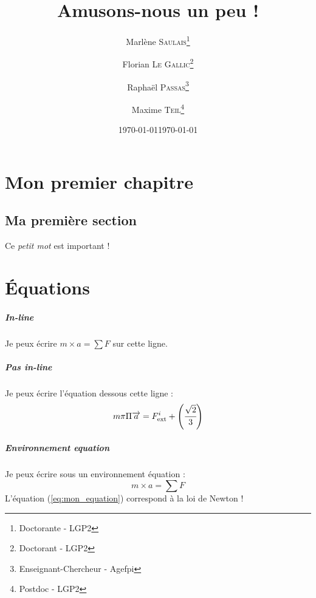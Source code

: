 \documentclass[a4paper, 13pt]{report} %
\date{\today}
\title{Amusons-nous un peu !}
\author{Marlène \textsc{Saulais}\thanks{Doctorante - LGP2}
		\and Florian \textsc{Le Gallic}\thanks{Doctorant - LGP2}
		\and Rapha\"el \textsc{Passas}\thanks{Enseignant-Chercheur - Agefpi}
		\and Maxime \textsc{Teil}\thanks{Postdoc - LGP2}}
\date{\today}
\begin{document}
	
	\maketitle
	
	\chapter{Mon premier chapitre}
	\blindtext
	\section{Ma première section}
	\blindtext[3]
	Ce \emph{petit mot} est important !\\
	\chapter{\'Equations}
	\paragraph{In-line}
	Je peux écrire $m \times a = \sum F$ sur cette ligne.
	\paragraph{Pas in-line}
	Je peux écrire l'équation dessous cette ligne :
	$$ m \pi \Pi \overrightarrow{a} = F^i_{\text{ext}} + \left(\cfrac{
		\sqrt{2}
		}{
		3
		}\right)  $$
	\paragraph{Environnement equation}
	Je peux écrire sous un environnement équation :
	\begin{equation}\label{eq:mon_equation}
		m \times a = \sum F
	\end{equation}
	L'équation (\ref{eq:mon_equation}) correspond à la loi de Newton !
	
	
\end{document}
